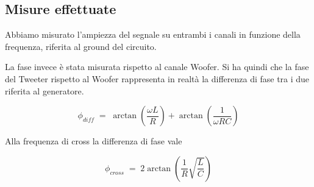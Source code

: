\documentclass[../Relazione_circuiti]{subfiles}
\begin{document}
\subsection{Misure effettuate}
  Abbiamo misurato l'ampiezza del segnale su entrambi i canali in funzione della frequenza, riferita al ground del circuito.

  La fase invece è stata misurata rispetto al canale Woofer. Si ha quindi che la fase del Tweeter rispetto al Woofer
  rappresenta in realtà la differenza di fase tra i due riferita al generatore.

  \begin{equation}
    \label{eq:p_diff}
    \phi_{diff} \; = \; \arctan(\frac{\omega L}{R}) + \arctan(\frac{1}{\omega RC})
  \end{equation}

  Alla frequenza di cross la differenza di fase vale

  \begin{equation}
    \label{eq:p_diff_cross}
    \phi_{cross} \; = \; 2 \arctan(\frac{1}{R} \sqrt{\frac{L}{C}})
  \end{equation}
\end{document}
